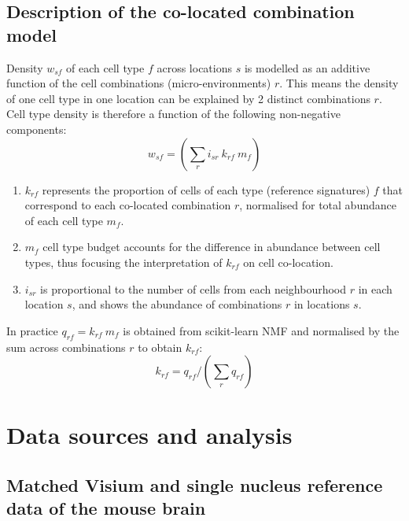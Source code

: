 \documentclass[11pt,a4paper]{article}
\begin{document}
\subsection{Description of the co-located combination model} \label{cell_neighbourhoods_model}

Density $w_{sf}$ of each cell type $f$ across locations $s$ is modelled as an additive function of the cell combinations (micro-environments) $r$. This means the density of one cell type in one location can be explained by 2 distinct combinations $r$. Cell type density is therefore a function of the following non-negative components:  
\begin{equation} \label{eq:circ:1}
w_{sf} = (\sum_{r} {i_{sr} \: k_{rf} \: m_{f}})
\end{equation}

\begin{enumerate}
    \item $k_{rf}$ represents the proportion of cells of each type (reference signatures) $f$ that correspond to each co-located combination $r$, normalised for total abundance of each cell type $m_{f}$.
    \item $m_{f}$ cell type budget accounts for the difference in abundance between cell types, thus focusing the interpretation of $k_{rf}$ on cell co-location.
    \item $i_{sr}$ is proportional to the number of cells from each neighbourhood $r$ in each location $s$, and shows the abundance of combinations $r$ in locations $s$.
\end{enumerate}

In practice $q_{rf} = k_{rf} \: m_{f}$ is obtained from scikit-learn NMF and normalised by the sum across combinations $r$ to obtain $k_{rf}$:
\begin{equation} \label{eq:circ:2}
k_{rf} = q_{rf} / (\sum_{r} q_{rf})
\end{equation}

\section{Data sources and analysis} \label{data_analysis}

\subsection{Matched Visium and single nucleus reference data of the mouse brain} \label{data_analysis_mouse_brain}
\end{document}
